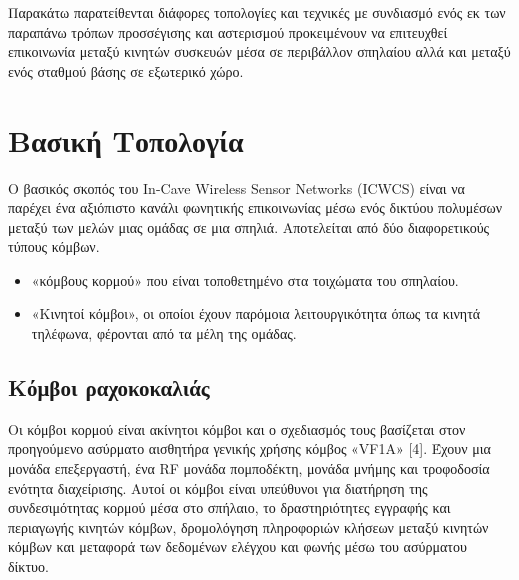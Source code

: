 \documentclass[12pt]{article}
\begin{document}
\begin{multicols}{2}
    Παρακάτω παρατείθενται διάφορες τοπολογίες και τεχνικές με συνδιασμό ενός εκ των παραπάνω τρόπων προσσέγισης και αστερισμού προκειμένουν να επιτευχθεί επικοινωνία μεταξύ κινητών συσκευών μέσα σε περιβάλλον σπηλαίου αλλά και μεταξύ ενός σταθμού βάσης σε εξωτερικό χώρο.

    \section{\normalsize  \textsf{Βασική Τοπολογία}}
    Ο βασικός σκοπός του In-Cave Wireless Sensor Networks (ICWCS) είναι να παρέχει ένα αξιόπιστο κανάλι φωνητικής επικοινωνίας μέσω ενός δικτύου πολυμέσων μεταξύ των μελών
    μιας ομάδας σε μια σπηλιά. Αποτελείται από δύο διαφορετικούς τύπους κόμβων. 
    \begin{itemize}
        \item «κόμβους κορμού» που είναι τοποθετημένο στα τοιχώματα του σπηλαίου.
        \item «Κινητοί κόμβοι», οι οποίοι έχουν παρόμοια λειτουργικότητα όπως τα κινητά τηλέφωνα, φέρονται από τα μέλη της ομάδας.
    \end{itemize}

    \subsection{\small \textsf{Κόμβοι ραχοκοκαλιάς}}
        Οι κόμβοι κορμού είναι ακίνητοι κόμβοι και ο σχεδιασμός τους
        βασίζεται στον προηγούμενο ασύρματο αισθητήρα γενικής χρήσης
        κόμβος «VF1A» [4]. Έχουν μια μονάδα επεξεργαστή, ένα RF
        μονάδα πομποδέκτη, μονάδα μνήμης και τροφοδοσία
        ενότητα διαχείρισης. Αυτοί οι κόμβοι είναι υπεύθυνοι για
        διατήρηση της συνδεσιμότητας κορμού μέσα στο σπήλαιο, το
        δραστηριότητες εγγραφής και περιαγωγής κινητών κόμβων,
        δρομολόγηση πληροφοριών κλήσεων μεταξύ κινητών κόμβων και
        μεταφορά των δεδομένων ελέγχου και φωνής μέσω του ασύρματου
        δίκτυο.

\end{multicols}
\end{document}
